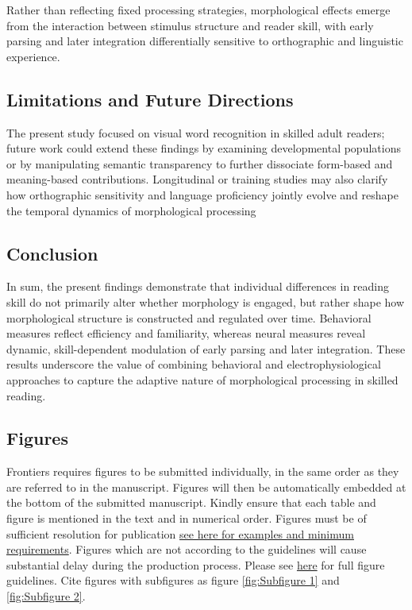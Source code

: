 \documentclass[utf8]{FrontiersinHarvard} %
\begin{document}
Rather than reflecting fixed processing strategies, morphological effects emerge from the interaction between stimulus structure and reader skill, with early parsing and later integration differentially sensitive to orthographic and linguistic experience.

\subsection{Limitations and Future Directions}

The present study focused on visual word recognition in skilled adult readers; future work could extend these findings by examining developmental populations or by manipulating semantic transparency to further dissociate form-based and meaning-based contributions. Longitudinal or training studies may also clarify how orthographic sensitivity and language proficiency jointly evolve and reshape the temporal dynamics of morphological processing

\subsection{Conclusion}

In sum, the present findings demonstrate that individual differences in reading skill do not primarily alter whether morphology is engaged, but rather shape how morphological structure is constructed and regulated over time. Behavioral measures reflect efficiency and familiarity, whereas neural measures reveal dynamic, skill-dependent modulation of early parsing and later integration. These results underscore the value of combining behavioral and electrophysiological approaches to capture the adaptive nature of morphological processing in skilled reading.

\subsection{Figures}
Frontiers requires figures to be submitted individually, in the same order as they are referred to in the manuscript. Figures will then be automatically embedded at the bottom of the submitted manuscript. Kindly ensure that each table and figure is mentioned in the text and in numerical order. Figures must be of sufficient resolution for publication \href{https://www.frontiersin.org/about/author-guidelines#ImageSizeRequirements}{see here for examples and minimum requirements}. Figures which are not according to the guidelines will cause substantial delay during the production process. Please see \href{https://www.frontiersin.org/about/author-guidelines#FigureRequirementsStyleGuidelines}{here} for full figure guidelines. Cite figures with subfigures as figure \ref{fig:Subfigure 1} and \ref{fig:Subfigure 2}.
\end{document}

